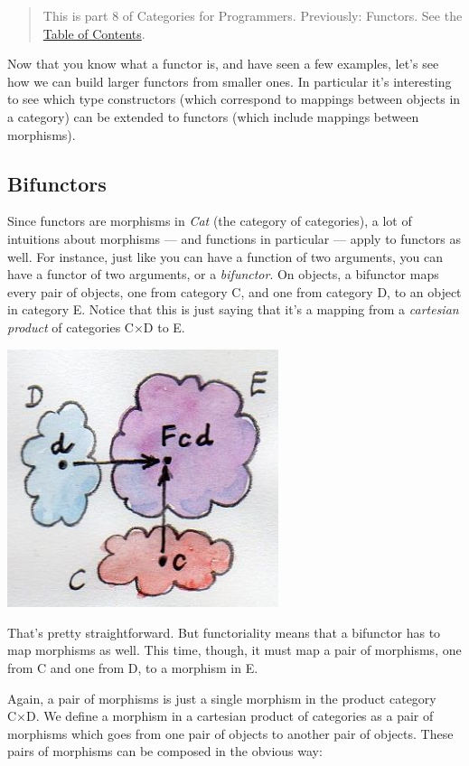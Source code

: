 \begin{quote}
This is part 8 of Categories for Programmers. Previously: {Functors}.
See the
\href{https://bartoszmilewski.com/2014/10/28/category-theory-for-programmers-the-preface/}{Table
of Contents}.
\end{quote}

Now that you know what a functor is, and have seen a few examples, let's
see how we can build larger functors from smaller ones. In particular
it's interesting to see which type constructors (which correspond to
mappings between objects in a category) can be extended to functors
(which include mappings between morphisms).

\subsection{Bifunctors}\label{bifunctors}

Since functors are morphisms in \emph{Cat} (the category of categories),
a lot of intuitions about morphisms --- and functions in particular ---
apply to functors as well. For instance, just like you can have a
function of two arguments, you can have a functor of two arguments, or a
\emph{bifunctor}. On objects, a bifunctor maps every pair of objects,
one from category C, and one from category D, to an object in category
E. Notice that this is just saying that it's a mapping from a
\emph{cartesian product} of categories C×D to E.

\includegraphics[width=3.12500in]{images/bifunctor.jpg}

That's pretty straightforward. But functoriality means that a bifunctor
has to map morphisms as well. This time, though, it must map a pair of
morphisms, one from C and one from D, to a morphism in E.

Again, a pair of morphisms is just a single morphism in the product
category C×D. We define a morphism in a cartesian product of categories
as a pair of morphisms which goes from one pair of objects to another
pair of objects. These pairs of morphisms can be composed in the obvious
way:

